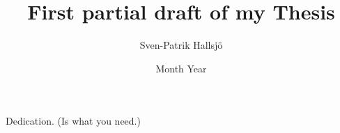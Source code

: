 \documentclass[twoside,hidelinks]{glasgowthesis}
\begin{document}
\pagestyle{empty}

\title{First partial draft of my Thesis}
\author{Sven-Patrik Hallsj{\"o}}
\date{Month Year}

\maketitle

\cleardoublepage

 

\cleardoublepage
\vspace*{1.75in}
\begin{flushright} Dedication. (Is what you need.)\end{flushright}

\newpage
 

\newpage
 










\tableofcontents
\listoftables
\listoffigures

\cleardoublepage
\pagestyle{fancy}
\setcounter{page}{1}
\end{document}
